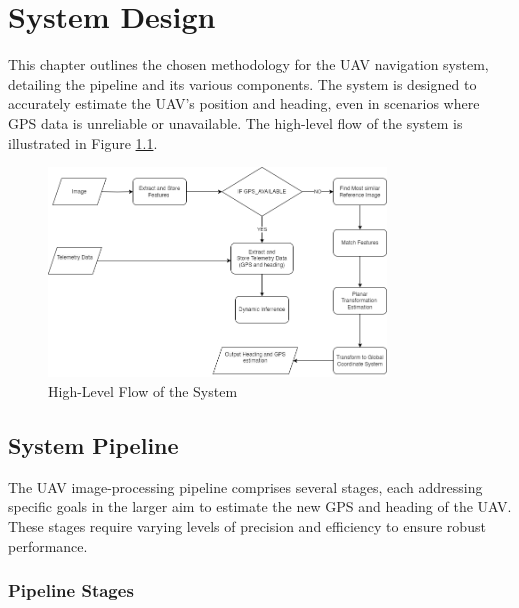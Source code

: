 

\chapter{System Design}

This chapter outlines the chosen methodology for the UAV navigation system, detailing the pipeline and its various components. The system is designed to accurately estimate the UAV's position and heading, even in scenarios where GPS data is unreliable or unavailable. The high-level flow of the system is illustrated in Figure \ref{fig:HighLevelFlow}.

\begin{figure}[H]
    \centering
    \includegraphics[width=0.8\textwidth]{Chapter 3/Chap3Figs/HighLevelFlow.png}
    \caption{High-Level Flow of the System}
    \label{fig:HighLevelFlow}
\end{figure}



\section{System Pipeline}

The UAV image-processing pipeline comprises several stages, each addressing specific goals in the larger aim to estimate the new GPS and heading of the UAV. These stages require varying levels of precision and efficiency to ensure robust performance.

\subsection{Pipeline Stages}

